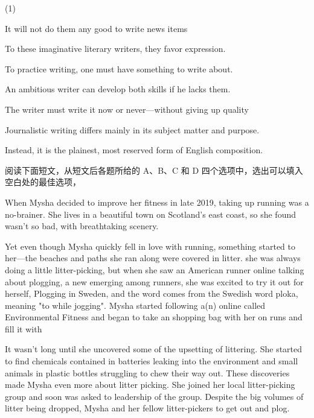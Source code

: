 \documentclass{英语试卷}
\begin{document}
\begin{choices}(1)
  \item It will not do them any good to write news items
  \item To these imaginative literary writers, they favor expression.
  \item To practice writing, one must have something to write about.
  \item An ambitious writer can develop both skills if he lacks them.
  \item The writer must write it now or never—without giving up quality
  \item Journalistic writing differs mainly in its subject matter and purpose.
  \item Instead, it is the plainest, most reserved form of English composition.
\end{choices}
\par 阅读下面短文，从短文后各题所给的 A、B、C 和 D 四个选项中，选出可以填入空白处的最佳选项，\par
\par When Mysha decided to improve her fitness in late 2019, taking up running was a no-brainer. She lives in a beautiful town on Scotland's east coast, so she found  wasn't so bad, with breathtaking scenery.\par
\par Yet even though Mysha quickly fell in love with running, something started to  her—the beaches and paths she ran along were covered in litter.  she was always doing a little litter-picking, but when she saw an American runner online talking about plogging, a new  emerging among runners, she was excited to try it out for herself, Plogging  in Sweden, and the word comes from the Swedish word ploka, meaning "to  while jogging". Mysha started following a(n)  online called Environmental Fitness and began to take an shopping bag with her on runs and fill it with \par
\par It wasn't long until she uncovered some of the upsetting  of littering. She started to find  chemicals contained in batteries leaking into the environment and small animals  in plastic bottles struggling to chew their way out. These discoveries made Mysha even more  about litter picking. She joined her local litter-picking group and soon was asked to  leadership of the group. Despite the big volumes of litter being dropped, Mysha and her fellow litter-pickers  to get out and plog.\par
\end{document}
